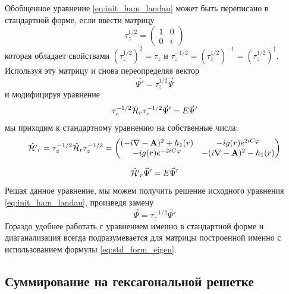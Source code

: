 \documentclass[a4paper,article,14pt]{extarticle}
\begin{document}
Обобщенное уравнение \eqref{eq:init_ham_landau} может быть переписано в стандартной форме, если ввести матрицу
$$
\tau_z^{1/2} = 
	\begin{pmatrix} 	
		1 &  0 \\
		0 &  i 
	\end{pmatrix}
$$
которая обладает свойствами $(\tau_z^{1/2})^2 = \tau_z$ и $\tau_z^{-1/2}=(\tau_z^{1/2})^{-1}=(\tau_z^{1/2})^\dagger$.
Используя эту матрицу и снова переопределяя вектор 
$$
\vec{\Psi}'=\tau_z^{1/2} \vec{\Psi}
$$
и модифицируя уравнение
$$
\tau_z^{-1/2} \hat {\cal H}_{r} \tau_z^{-1/2} \vec{\Psi}' = E \vec{\Psi}'
$$
мы приходим к стандартному уравнению на собственные числа:
\begin{equation}
\label{eq:std_form_eigen}
\hat {\cal H'}_{r} = \tau_z^{-1/2} \hat {\cal H}_{r} \tau_z^{-1/2} = \begin{pmatrix} 
(- i \nabla - \mathbf{A} ) ^ 2 + h_1 (r) &  -i g (r) e^{2 i C \varphi} \\  
-i g (r) e^{-2 i C \varphi}   & - ( i \nabla - \mathbf{A} ) ^ 2 - h_1 (r) 
\end{pmatrix}
\end{equation}

$$
\hat {\cal H'}_{r} \vec{\Psi}' = E \vec{\Psi}'
$$
Решая данное уравнение, мы можем получить решение исходного уравнения \eqref{eq:init_ham_landau}, произведя замену
$$
\vec{\Psi} = \tau_z^{-1/2} \vec{\Psi}'
$$
Гораздо удобнее работать с уравнением именно в стандартной форме и диаганализация всегда подразумевается для матрицы построенной именно с использованием формулы \eqref{eq:std_form_eigen}.


\subsection{ Суммирование на гексагональной решетке }
\end{document}
